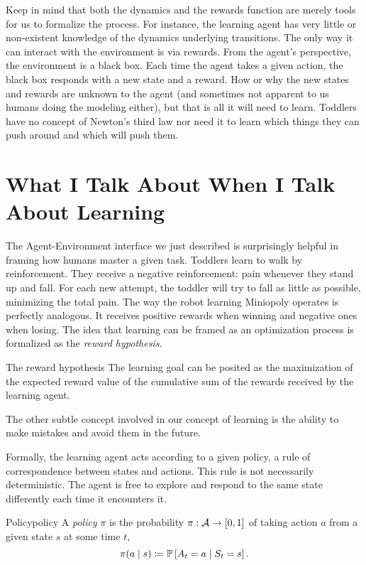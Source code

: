Keep in mind that both the dynamics and the rewards function are merely tools
for us to formalize the process. For instance, the learning agent has very
little or non-existent knowledge of the dynamics underlying transitions. The
only way it can interact with the environment is via rewards. From the agent's
perspective, the environment is a black box. Each time the agent takes a given
action, the black box responds with a new state and a reward. How or why the new
states and rewards are unknown to the agent (and sometimes not apparent to us
humans doing the modeling either), but that is all it will need to learn.
Toddlers have no concept of Newton's third law nor need it to learn which things
they can push around and which will push them.

\section{What I Talk About When I Talk About Learning} The Agent-Environment
interface we just described is surprisingly helpful in framing how humans master
a given task. Toddlers learn to walk by reinforcement.  They receive a negative
reinforcement: pain whenever they stand up and fall.  For each new attempt, the
toddler will try to fall as little as possible, minimizing the total pain. The
way the robot learning Miniopoly operates is perfectly analogous. It receives
positive rewards when winning and negative ones when losing.  The idea that
learning can be framed as an optimization process is formalized as the
\emph{reward hypothesis}.

\begin{remark}{The reward hypothesis}
	The learning goal can be posited as the maximization of the expected reward
	value of the cumulative sum of the rewards received by the learning agent. 
\end{remark}

The other subtle concept involved in our concept of learning is the
ability to make mistakes and avoid them in the future.

Formally, the learning agent acts according to a given policy, a rule of
correspondence between states and actions. This rule is not necessarily
deterministic. The agent is free to explore and respond to the same state
differently each time it encounters it.

\begin{dfn}{Policy}{policy}
	A \emph{policy} $\pi$ is the probability $\pi: \mathcal{A} \to [0,1]$ of taking
	action $a$ from a given state $s$ at some time $t$,
	\[
		\pi(a \mid s) \coloneqq \mathbb{P}\left[A_t = a \mid S_t = s\right].
	\]
\end{dfn}

